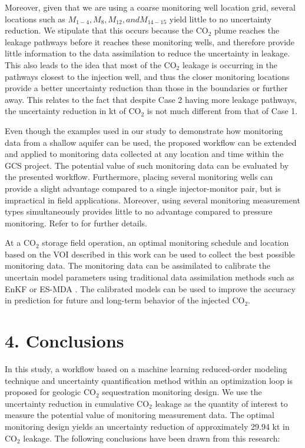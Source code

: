 \documentclass[10pt, twoside]{article}
\begin{document}
Moreover, given that we are using a coarse monitoring well location grid, several locations such as $M_{1-4}, M_8, M_{12}, and M_{14-15}$ yield little to no uncertainty reduction. We stipulate that this occurs because the CO$_2$ plume reaches the leakage pathways before it reaches these monitoring wells, and therefore provide little information to the data assimilation to reduce the uncertainty in leakage. This also leads to the idea that most of the CO$_2$ leakage is occurring in the pathways closest to the injection well, and thus the closer monitoring locations provide a better uncertainty reduction than those in the boundaries or further away. This relates to the fact that despite Case 2 having more leakage pathways, the uncertainty reduction in kt of CO$_2$ is not much different from that of Case 1.

Even though the examples used in our study to demonstrate how monitoring data from a shallow aquifer can be used, the proposed workflow can be extended and applied to monitoring data collected at any location and time within the GCS project. The potential value of such monitoring data can be evaluated by the presented workflow. Furthermore, placing several monitoring wells can provide a slight advantage compared to a single injector-monitor pair, but is impractical in field applications. Moreover, using several monitoring measurement types simultaneously provides little to no advantage compared to pressure monitoring. Refer to \citet{Chen2018} for further details.

At a CO$_2$ storage field operation, an optimal monitoring schedule and location based on the VOI described in this work can be used to collect the best possible monitoring data. The monitoring data can be assimilated to calibrate the uncertain model parameters using traditional data assimilation methods such as EnKF \citep{Evensen20091} or ES-MDA \citep{Emerick20133}. The calibrated models can be used to improve the accuracy in prediction for future and long-term behavior of the injected CO$_2$.

\section*{\textbf{4. Conclusions}}
In this study, a workflow based on a machine learning reduced-order modeling technique and uncertainty quantification method within an optimization loop is proposed for geologic CO$_2$ sequestration monitoring design. We use the uncertainty reduction in cumulative CO$_2$ leakage as the quantity of interest to measure the potential value of monitoring measurement data. The optimal monitoring design yields an uncertainty reduction of approximately 29.94 kt in CO$_2$ leakage. The following conclusions have been drawn from this research:
\end{document}
